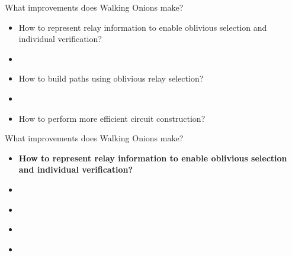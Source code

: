 \documentclass[hyperref={pdfpagelabels=true},table,dvipsnames,14pt,aspectratio=169]{beamer}
\begin{document}
\begin{frame}{What improvements does Walking Onions make?}
  \begin{itemize}
    \item<1-> How to represent relay information to enable oblivious
      selection and individual verification?
    \item<2->[]~
    \item<2-> How to build paths using oblivious relay selection?
    \item<2->[]~
    \item<3-> How to perform more efficient circuit construction?
  \end{itemize}
\end{frame}

\begin{frame}{What improvements does Walking Onions make?}
  \begin{itemize}
    \item<1-> \textbf{How to represent relay information to enable oblivious
      selection and individual verification?}
    \item<1->[]~
    \item<1->[]~
    \item<1->[]~
    \item<1->[]~
  \end{itemize}
\end{frame}
\end{document}
